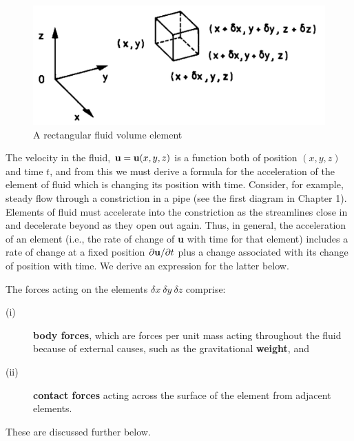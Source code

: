 \documentclass[10pt]{report}
\begin{document}
\begin{figure}[htbp]
\centerline{\includegraphics[width=4.5in]{Section21.pdf}}
\label{fig1.1}
\caption{ A rectangular fluid volume element }
\end{figure}

The velocity in the fluid, ${\bf u} = {\bf u}(x,y,z)$ is a function both of
position $(x,y,z)$ and time $t$, and from this we must derive a formula for the
acceleration of the element of fluid which is changing its position with
time. Consider, for example, steady flow through a constriction in a pipe
(see the first diagram in Chapter 1). Elements of fluid must accelerate into
the constriction as the streamlines close in and decelerate beyond as they
open out again. Thus, in general, the acceleration of an element (i.e., the
rate of change of \textbf{u} with time for that element) includes a rate of
change at a fixed position $\partial {\bf u}/\partial t$ plus a change
associated with its change of position with time. We derive an expression
for the latter below.

The forces acting on the elements $\delta x\ \delta y\ \delta z$ comprise:
\begin{description}
\item[(i)] \textbf{body forces}, which are forces per unit mass acting throughout
the fluid because of external causes, such as the gravitational
\textbf{weight}, and
\item[(ii)] \textbf{contact forces} acting across the surface of the element from
adjacent elements.
\end{description}
These are discussed further below.
\end{document}
